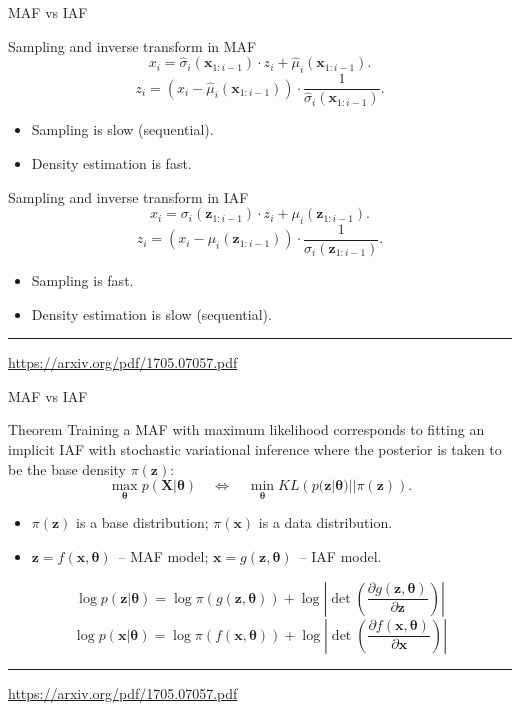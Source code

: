 \documentclass{beamer}
\newcommand{\bx}{\mathbf{x}}
\newcommand{\bz}{\mathbf{z}}
\newcommand{\bX}{\mathbf{X}}
\newcommand{\btheta}{\boldsymbol{\theta}}
\begin{document}
\begin{frame}{MAF vs IAF}
	\begin{block}{Sampling and inverse transform in MAF}
		\vspace{-0.2cm}
		\[
		x_i = \hat{\sigma}_i (\bx_{1:i-1}) \cdot z_i + \hat{\mu}_i(\bx_{1:i-1}).
		\]
		\[
		z_i = \left(x_i - \hat{\mu}_i(\bx_{1:i-1}) \right) \cdot \frac{1}{\hat{\sigma}_i (\bx_{1:i-1}) }.
		\]
		\vspace{-0.5cm}
		\begin{itemize}
			\item Sampling is slow (sequential).
			\item Density estimation is fast.
		\end{itemize}
	\end{block}
	\begin{block}{Sampling and inverse transform in IAF}
		\vspace{-0.2cm}
		\[
		x_i = \sigma_i (\bz_{1:i-1}) \cdot z_i + \mu_i(\bz_{1:i-1}).
		\]
		\[
		z_i = \left(x_i - \mu_i(\bz_{1:i-1}) \right) \cdot \frac{1}{\sigma_i (\bz_{1:i-1})}.
		\]
		\vspace{-0.3cm}
		\begin{itemize}
			\item Sampling is fast.
			\item Density estimation is slow (sequential).
		\end{itemize}
	\end{block}
	
	\vfill
	\hrule\medskip
	{\scriptsize \href{https://arxiv.org/pdf/1705.07057.pdf}{https://arxiv.org/pdf/1705.07057.pdf}} 
\end{frame}
\begin{frame}{MAF vs IAF}
	\begin{block}{Theorem}
		Training a MAF with maximum likelihood corresponds to fitting an implicit IAF  with stochastic variational inference where the posterior is taken to be the base density $\pi(\bz)$:
		\[  
		\max_{\btheta} p(\bX | \btheta) \quad \Leftrightarrow \quad \min_{\btheta} KL\left(p(\bz | \btheta) || \pi(\bz)\right).
		\]
		\vspace{-0.5cm}
		\begin{itemize}
			\item $\pi(\bz)$ is a base distribution; $\pi(\bx)$ is a data distribution.
			\item $\bz = f(\bx, \btheta)$~-- MAF model; $\bx = g(\bz, \btheta)$~-- IAF model.
		\end{itemize}
	\end{block}
	\vspace{-0.3cm}
	\[
	\log p(\bz | \btheta) = \log \pi(g(\bz, \btheta)) + \log \left| \det \left( \frac{\partial g(\bz, \btheta)}{\partial \bz}\right) \right|
	\]
	\[
	\log p(\bx | \btheta) = \log \pi(f(\bx, \btheta)) + \log \left| \det \left( \frac{\partial f(\bx, \btheta)}{\partial \bx}\right) \right|
	\]
	\vfill
	\hrule\medskip
	{\scriptsize \href{https://arxiv.org/pdf/1705.07057.pdf}{https://arxiv.org/pdf/1705.07057.pdf}} 
\end{frame}
\end{document}
